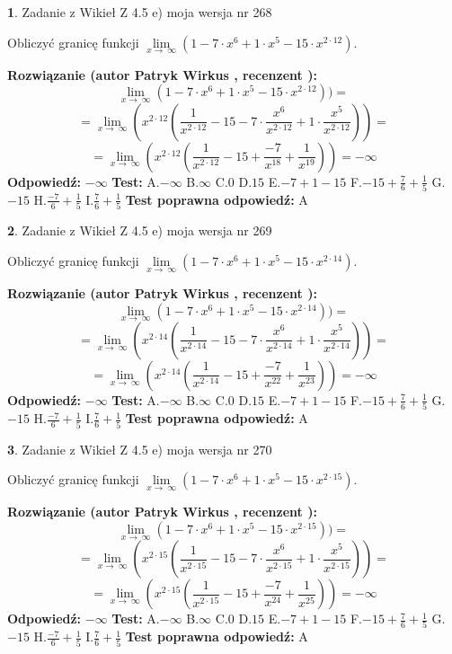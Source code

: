 \documentclass[12pt, a4paper]{article}
\theoremstyle{definition} %
\newtheorem{zad}{}
\newcommand{\zadStart}[1]{\begin{zad}#1\newline}
\newcommand{\zadStop}{\end{zad}}
\newcommand{\rozwStart}[2]{\noindent \textbf{Rozwiązanie (autor #1 , recenzent #2): }\newline}
\newcommand{\rozwStop}{\newline}
\newcommand{\odpStart}{\noindent \textbf{Odpowiedź:}\newline}
\newcommand{\odpStop}{\newline}
\newcommand{\testStart}{\noindent \textbf{Test:}\newline}
\newcommand{\testStop}{\newline}
\newcommand{\kluczStart}{\noindent \textbf{Test poprawna odpowiedź:}\newline}
\newcommand{\kluczStop}{\newline}
\begin{document}
\zadStart{Zadanie z Wikieł Z 4.5 e) moja wersja nr 268}



Obliczyć granicę funkcji  $\lim\limits_{x\to\ \infty}(1 - 7 \cdot x^{6}+1 \cdot x^{5}- 15 \cdot x^{2\cdot12})$.
\zadStop
\rozwStart{Patryk Wirkus}{}
$$\lim\limits_{x\to\ \infty}(1 - 7 \cdot x^{6}+1 \cdot x^{5}- 15 \cdot x^{2\cdot12}))=$$
$$=\lim\limits_{x\to\ \infty}(x^{2\cdot12}(\frac{1}{x^{2\cdot12}}-15 -7 \cdot \frac{x^{6}}{x^{2\cdot12}}+1 \cdot \frac{x^{5}}{x^{2\cdot12}}))=$$
$$=\lim\limits_{x\to\ \infty}(x^{2\cdot12}(\frac{1}{x^{2\cdot12}}-15 + \frac{-7}{x^{18}}+ \frac{1}{x^{19}}))=-\infty$$
\rozwStop
\odpStart
$-\infty$
\odpStop
\testStart
A.$-\infty$ B.$\infty$ C.$0$ D.$15$ E.$-7 + 1 - 15$
F.$-15+\frac{7}{6}+\frac{1}{5}$ G.$-15$
H.$\frac{-7}{6}+\frac{1}{5}$
I.$\frac{7}{6}+\frac{1}{5}$
\testStop
\kluczStart
A
\kluczStop



\zadStart{Zadanie z Wikieł Z 4.5 e) moja wersja nr 269}



Obliczyć granicę funkcji  $\lim\limits_{x\to\ \infty}(1 - 7 \cdot x^{6}+1 \cdot x^{5}- 15 \cdot x^{2\cdot14})$.
\zadStop
\rozwStart{Patryk Wirkus}{}
$$\lim\limits_{x\to\ \infty}(1 - 7 \cdot x^{6}+1 \cdot x^{5}- 15 \cdot x^{2\cdot14}))=$$
$$=\lim\limits_{x\to\ \infty}(x^{2\cdot14}(\frac{1}{x^{2\cdot14}}-15 -7 \cdot \frac{x^{6}}{x^{2\cdot14}}+1 \cdot \frac{x^{5}}{x^{2\cdot14}}))=$$
$$=\lim\limits_{x\to\ \infty}(x^{2\cdot14}(\frac{1}{x^{2\cdot14}}-15 + \frac{-7}{x^{22}}+ \frac{1}{x^{23}}))=-\infty$$
\rozwStop
\odpStart
$-\infty$
\odpStop
\testStart
A.$-\infty$ B.$\infty$ C.$0$ D.$15$ E.$-7 + 1 - 15$
F.$-15+\frac{7}{6}+\frac{1}{5}$ G.$-15$
H.$\frac{-7}{6}+\frac{1}{5}$
I.$\frac{7}{6}+\frac{1}{5}$
\testStop
\kluczStart
A
\kluczStop



\zadStart{Zadanie z Wikieł Z 4.5 e) moja wersja nr 270}



Obliczyć granicę funkcji  $\lim\limits_{x\to\ \infty}(1 - 7 \cdot x^{6}+1 \cdot x^{5}- 15 \cdot x^{2\cdot15})$.
\zadStop
\rozwStart{Patryk Wirkus}{}
$$\lim\limits_{x\to\ \infty}(1 - 7 \cdot x^{6}+1 \cdot x^{5}- 15 \cdot x^{2\cdot15}))=$$
$$=\lim\limits_{x\to\ \infty}(x^{2\cdot15}(\frac{1}{x^{2\cdot15}}-15 -7 \cdot \frac{x^{6}}{x^{2\cdot15}}+1 \cdot \frac{x^{5}}{x^{2\cdot15}}))=$$
$$=\lim\limits_{x\to\ \infty}(x^{2\cdot15}(\frac{1}{x^{2\cdot15}}-15 + \frac{-7}{x^{24}}+ \frac{1}{x^{25}}))=-\infty$$
\rozwStop
\odpStart
$-\infty$
\odpStop
\testStart
A.$-\infty$ B.$\infty$ C.$0$ D.$15$ E.$-7 + 1 - 15$
F.$-15+\frac{7}{6}+\frac{1}{5}$ G.$-15$
H.$\frac{-7}{6}+\frac{1}{5}$
I.$\frac{7}{6}+\frac{1}{5}$
\testStop
\kluczStart
A
\kluczStop
\end{document}
